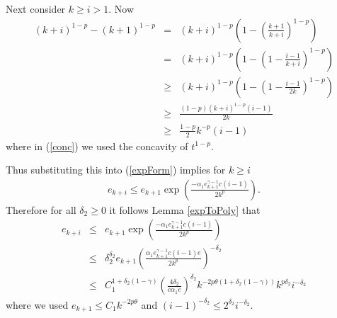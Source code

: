 Next consider $k\geq i>1$. Now
\begin{eqnarray}
(k+i)^{1-p} - (k+1)^{1-p}
&=&
(k+i)^{1-p}
\left(
1-
\left(
\frac{k+1}{k+i}
\right)^{1-p}
\right)
\nonumber\\
&=&
(k+i)^{1-p}
\left(
1-
\left(
1-\frac{i-1}{k+i}
\right)^{1-p}
\right)
\nonumber\\
&\geq&
(k+i)^{1-p}
\left(
1-
\left(1-
\frac{i-1}{2k}
\right)^{1-p}
\right)
\nonumber\\
&\geq&
\frac{
(1-p)(k+i)^{1-p} 
(i-1)
}{2k}
\label{conc}\\\nonumber
&\geq&
\frac{1-p}{2}
k^{-p}
(i-1)
\end{eqnarray}
where in (\ref{conc}) we used the concavity of $t^{1-p}$.
\begin{comment}
We now use the assumption that $1-d=2^{-n}\triangleq \alpha$. So that $2^n \alpha = 1$. For example $d=1-\frac{1}{16}$. 
Then we use
\begin{eqnarray*}
(k+i)^\alpha - (k+1)^\alpha
&=&
\frac{(k+i)^{2\alpha} - (k+1)^{2\alpha}}{(k+i)^\alpha + (k+1)^\alpha}
\\
&\geq&
\frac{(k+i)^{2\alpha} - (k+1)^{2\alpha}}{2\cdot (2k)^{\alpha}}.
\end{eqnarray*}
\alpha_1pplying this recursively we get
\begin{eqnarray*}
(k+i)^\alpha - (k+1)^\alpha
&\geq&
\frac{i-1}
{2\cdot(2k)^\alpha\cdot 2(2k^{2\alpha})\cdots 2(2k)^{\frac{1}{2}}}
\\
&=&
\frac{i-1}
{2^n(2k)^{d}}.
\end{eqnarray*}
\end{comment}
Thus substituting this into (\ref{expForm}) implies for $k\geq i$
\begin{eqnarray*}
e_{k+i}
\leq 
e_{k+1}
\exp\left(
\frac{-\alpha_1  e_{k+1}^{\gamma-1} c(i-1)}
{2k^p}
\right).
\end{eqnarray*}
Therefore for all $\delta_2\geq 0$
it follows Lemma \ref{expToPoly} that
\begin{eqnarray}
e_{k+i}
&\leq&
e_{k+1}\exp\left(
\frac{-\alpha_1  e_{k+1}^{\gamma-1}c(i-1)}
{2k^{p}}
\right)
\nonumber\\
&\leq&
\delta_2^{\delta_2} e_{k+1}
\left(
\frac{\alpha_1  e_{k+1}^{\gamma-1} c(i-1)e}
{2k^{p}}
\right)^{-\delta_2}
\nonumber\\\label{step}
&\leq&
 C_1^{1+\delta_2(1-\gamma)}
\left(\frac{4\delta_2}{c \alpha_1 e}\right)^{\delta_2}  
k^{-2p\theta(1+\delta_2(1-\gamma))} k^{p\delta_2}i^{-\delta_2}
\end{eqnarray}
where we used $e_{k+1}\leq C_1 k^{-2p\theta}$ and $(i-1)^{-\delta_2}\leq 2^{\delta_2} i^{-\delta_2}$.

